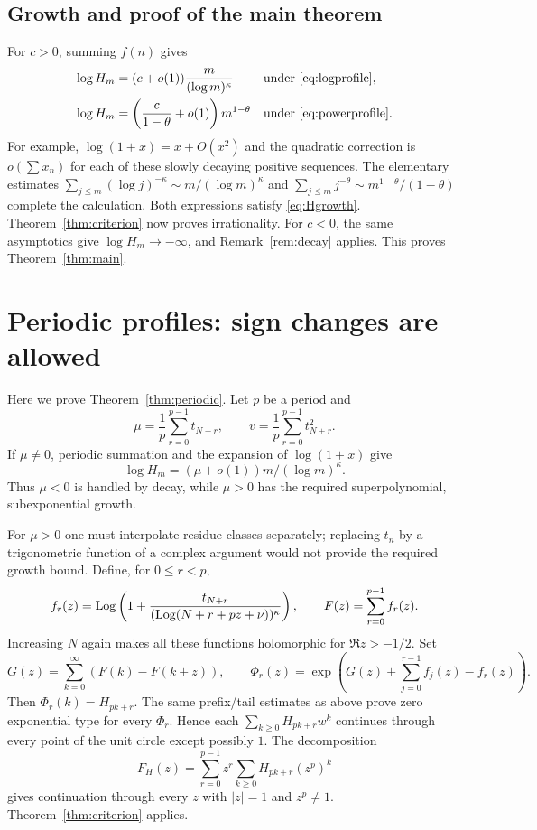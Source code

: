 \documentclass[11pt,a4paper]{article}
\theoremstyle{remark}\newtheorem{remark}[theorem]{Remark}
\begin{document}
\subsection{Growth and proof of the main theorem}
For $c>0$, summing $f(n)$ gives
\begin{align}
 \log H_m&=(c+o(1))\frac m{(\log m)^\kappa}
                  &&\text{under \eqref{eq:logprofile}},\label{eq:loggrowth}\\
 \log H_m&=\left(\frac c{1-\theta}+o(1)\right)m^{1-\theta}
                  &&\text{under \eqref{eq:powerprofile}}.\label{eq:powergrowth}
\end{align}
For example, $\log(1+x)=x+O(x^2)$ and the quadratic correction is
$o(\sum x_n)$ for each of these slowly decaying positive sequences.
The elementary estimates
$\sum_{j\le m}(\log j)^{-\kappa}\sim m/(\log m)^\kappa$ and
$\sum_{j\le m}j^{-\theta}\sim m^{1-\theta}/(1-\theta)$ complete the calculation.
Both expressions satisfy \eqref{eq:Hgrowth}. Theorem~\ref{thm:criterion}
now proves irrationality. For $c<0$, the same asymptotics give
$\log H_m\to-\infty$, and Remark~\ref{rem:decay} applies. This proves
Theorem~\ref{thm:main}.

\section{Periodic profiles: sign changes are allowed}
Here we prove Theorem~\ref{thm:periodic}. Let $p$ be a period and
\[
 \mu=\frac1p\sum_{r=0}^{p-1}t_{N+r},\qquad
 v=\frac1p\sum_{r=0}^{p-1}t_{N+r}^2.
\]
If $\mu\ne0$, periodic summation and the expansion of $\log(1+x)$ give
\[
 \log H_m=(\mu+o(1))m/(\log m)^\kappa.
\]
Thus $\mu<0$ is handled by decay, while $\mu>0$ has the required
superpolynomial, subexponential growth.

For $\mu>0$ one must interpolate residue classes separately; replacing
$t_n$ by a trigonometric function of a complex argument would not provide
the required growth bound. Define, for $0\le r<p$,
\[
 f_r(z)=\operatorname{Log}\left(1+
 \frac{t_{N+r}}{(\operatorname{Log}(N+r+pz+\nu))^\kappa}\right),
 \qquad F(z)=\sum_{r=0}^{p-1}f_r(z).
\]
Increasing $N$ again makes all these functions holomorphic for
$\Re z>-1/2$. Set
\[
 G(z)=\sum_{k=0}^{\infty}(F(k)-F(k+z)),\qquad
 \Phi_r(z)=\exp\left(G(z)+\sum_{j=0}^{r-1}f_j(z)-f_r(z)\right).
\]
Then $\Phi_r(k)=H_{pk+r}$. The same prefix/tail estimates as above prove
zero exponential type for every $\Phi_r$. Hence each
$\sum_{k\ge0}H_{pk+r}w^k$ continues through every point of the unit circle
except possibly $1$. The decomposition
\[
 F_H(z)=\sum_{r=0}^{p-1}z^r\sum_{k\ge0}H_{pk+r}(z^p)^k
\]
gives continuation through every $z$ with $|z|=1$ and $z^p\ne1$.
Theorem~\ref{thm:criterion} applies.
\end{document}
